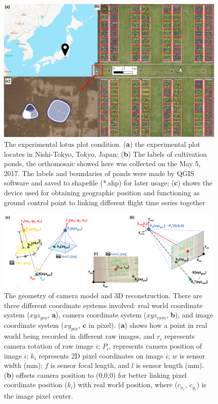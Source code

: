 \documentclass{configs/bmcart}
\begin{document}
\begin{backmatter}
\begin{figure}[!htb]
  \includegraphics[width=0.95\linewidth]{figures/map.pdf}
  \caption{The experimental lotus plot condition. (\textbf{a}) the experimental plot locates in Nishi-Tokyo, Tokyo, Japan; (\textbf{b}) The labels of cultivation ponds, the orthomosaic showed here was collected on the May 5, 2017. The labels and boundaries of ponds were made by QGIS software and saved to shapefile (*.shp) for later usage; (\textbf{c}) shows the device used for obtaining geographic position and functioning as ground control point to linking different flight time series together}
  \label{fig:map}
\end{figure}

\begin{figure}[!htb]
  \includegraphics[width=0.95\linewidth]{figures/raw2raw.pdf}
  \caption{The geometry of camera model and 3D reconstruction. There are three different coordinate systems involved: real world coordinate system ($xyz_{geo}$, \textbf{a}), camera coordinate system ($xyz_{cam}$, \textbf{b}), and image coordinate system ($xy_{pix}$, \textbf{c} in pixel). (\textbf{a}) shows how a point in real world being recorded in different raw images, and $r_i$ represents camera rotation of raw image $i$; $P_i$, represents camera position of image $i$; $k_i$ represents 2D pixel coordinates on image $i$; $w$ is sensor width (mm); $f$ is sensor focal length, and $l$ is sensor length (mm). (\textbf{b}) offsets camera position to (0,0,0) for better linking pixel coordinate position ($k_i$) with real world position, where ($c_{x_i}$, $c_{y_i}$) is the image pixel center.}
  \label{fig:geom}
\end{figure}


\end{backmatter}
\end{document}
